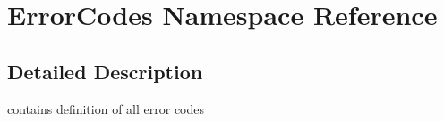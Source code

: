 \hypertarget{namespaceErrorCodes}{
\section{ErrorCodes Namespace Reference}
\label{namespaceErrorCodes}
}


\subsection{Detailed Description}
contains definition of all error codes 